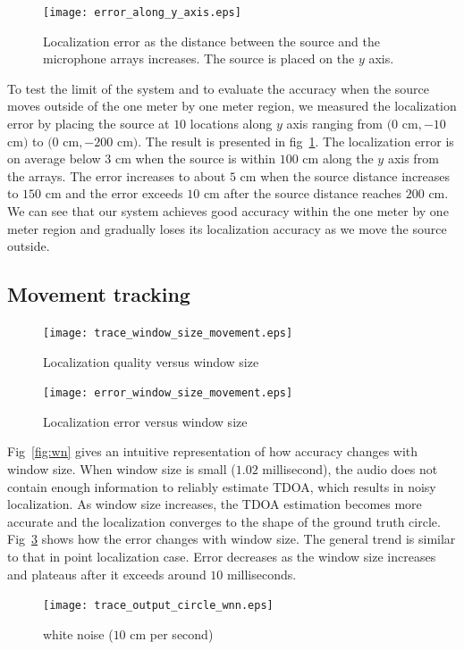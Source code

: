 \begin{figure}[h!]
\centering
\texttt{[image: error\_along\_y\_axis.eps]}
\caption{Localization error as the distance between the source and the microphone arrays increases. The source is placed on the $y$ axis.}
\label{fig:error_along_y}
\end{figure}
To test the limit of the system and to evaluate the accuracy when the source moves outside of the one meter by one meter region, we measured the localization error by placing the source at $10$ locations along $y$ axis ranging from $(0$ cm$, -10$ cm$)$ to $(0$ cm$, -200$ cm$)$. The result is presented in fig~\ref{fig:error_along_y}. The localization error is on average below $3$ cm when the source is within $100$ cm along the $y$ axis from the arrays. The error increases to about $5$ cm when the source distance increases to $150$ cm and the error exceeds $10$ cm after the source distance reaches $200$ cm. We can see that our system achieves good accuracy within the one meter by one meter region and gradually loses its localization accuracy as we move the source outside.  

\subsection{Movement tracking}
\begin{figure}[h!]
\centering
  \texttt{[image: trace\_window\_size\_movement.eps]}
\caption{Localization quality versus window size}\label{fig:wn}
\label{fig:trace_win_circle}
\end{figure}

\begin{figure}[h!]
\centering
\texttt{[image: error\_window\_size\_movement.eps]}
\caption{Localization error versus window size}
\label{fig:err_win_circle}
\end{figure}
Fig~\ref{fig:wn} gives an intuitive representation of how accuracy changes with window size. When window size is small ($1.02$ millisecond), the audio does not contain enough information to reliably estimate TDOA, which results in noisy localization. As window size increases, the TDOA estimation becomes more accurate and the localization converges to the shape of the ground truth circle. Fig~\ref{fig:err_win_circle} shows how the error changes with window size. The general trend is similar to that in point localization case. Error decreases as the window size increases and plateaus after it exceeds around $10$ milliseconds.

\begin{figure}[h!]
\centering
\texttt{[image: trace\_output\_circle\_wnn.eps]}
\caption{white noise ($10$ cm per second)}
\label{fig:circle_wnn}
\end{figure}

